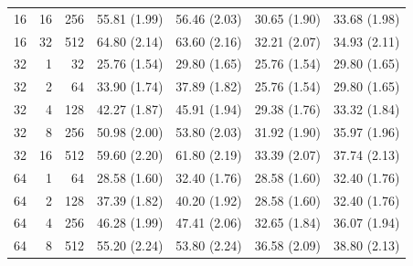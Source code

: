 \documentclass[11pt,letterpaper]{article}
\begin{document}
\begin{table}[!htbp]
\begin{tabular}{@{}rrr rrrr@{}}
16 & 16 & 256 & 55.81 {\scriptsize (1.99)} & 56.46 {\scriptsize (2.03)} & 30.65 {\scriptsize (1.90)} & 33.68 {\scriptsize (1.98)} \\
16 & 32 & 512 & 64.80 {\scriptsize (2.14)} & 63.60 {\scriptsize (2.16)} & 32.21 {\scriptsize (2.07)} & 34.93 {\scriptsize (2.11)} \\
\midrule
32 & 1 & 32 & 25.76 {\scriptsize (1.54)} & 29.80 {\scriptsize (1.65)} & 25.76 {\scriptsize (1.54)} & 29.80 {\scriptsize (1.65)} \\
32 & 2 & 64 & 33.90 {\scriptsize (1.74)} & 37.89 {\scriptsize (1.82)} & 25.76 {\scriptsize (1.54)} & 29.80 {\scriptsize (1.65)} \\
32 & 4 & 128 & 42.27 {\scriptsize (1.87)} & 45.91 {\scriptsize (1.94)} & 29.38 {\scriptsize (1.76)} & 33.32 {\scriptsize (1.84)} \\
32 & 8 & 256 & 50.98 {\scriptsize (2.00)} & 53.80 {\scriptsize (2.03)} & 31.92 {\scriptsize (1.90)} & 35.97 {\scriptsize (1.96)} \\
32 & 16 & 512 & 59.60 {\scriptsize (2.20)} & 61.80 {\scriptsize (2.19)} & 33.39 {\scriptsize (2.07)} & 37.74 {\scriptsize (2.13)} \\
\midrule
64 & 1 & 64 & 28.58 {\scriptsize (1.60)} & 32.40 {\scriptsize (1.76)} & 28.58 {\scriptsize (1.60)} & 32.40 {\scriptsize (1.76)} \\
64 & 2 & 128 & 37.39 {\scriptsize (1.82)} & 40.20 {\scriptsize (1.92)} & 28.58 {\scriptsize (1.60)} & 32.40 {\scriptsize (1.76)} \\
64 & 4 & 256 & 46.28 {\scriptsize (1.99)} & 47.41 {\scriptsize (2.06)} & 32.65 {\scriptsize (1.84)} & 36.07 {\scriptsize (1.94)} \\
64 & 8 & 512 & 55.20 {\scriptsize (2.24)} & 53.80 {\scriptsize (2.24)} & 36.58 {\scriptsize (2.09)} & 38.80 {\scriptsize (2.13)} \\
\bottomrule
\end{tabular}
\end{table}
\end{document}
